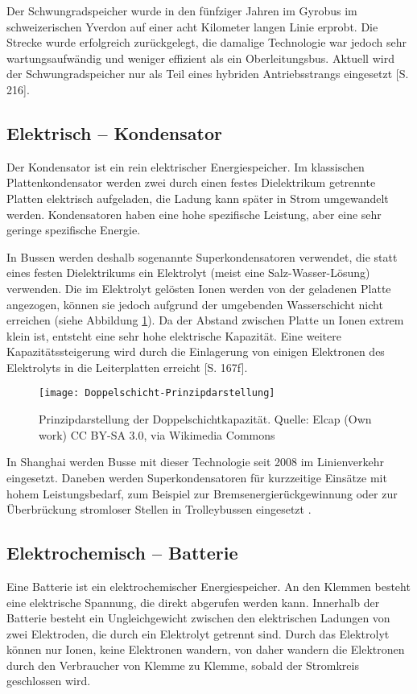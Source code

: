 Der Schwungradspeicher wurde in den fünfziger Jahren im Gyrobus im schweizerischen Yverdon auf einer acht Kilometer langen Linie erprobt. Die Strecke wurde erfolgreich zurückgelegt, die damalige Technologie war jedoch sehr wartungsaufwändig und weniger effizient als ein Oberleitungsbus. Aktuell wird der Schwungradspeicher nur als Teil eines hybriden Antriebsstrangs eingesetzt \cite{tub_aleph001746639}[S. 216].

\subsection{Elektrisch – Kondensator}
Der Kondensator ist ein rein elektrischer Energiespeicher. Im klassischen Plattenkondensator werden zwei durch einen festes Dielektrikum getrennte Platten elektrisch aufgeladen, die Ladung kann später in Strom umgewandelt werden. Kondensatoren haben eine hohe spezifische Leistung, aber eine sehr geringe spezifische Energie.

In Bussen werden deshalb sogenannte Superkondensatoren verwendet, die statt eines festen Dielektrikums ein Elektrolyt (meist eine Salz-Wasser-Lösung) verwenden. Die im Elektrolyt gelösten Ionen werden von der geladenen Platte angezogen, können sie jedoch aufgrund der umgebenden Wasserschicht nicht erreichen (siehe Abbildung \ref{abb_doppelschicht}). Da der Abstand zwischen Platte un Ionen extrem klein ist, entsteht eine sehr hohe elektrische Kapazität. Eine weitere Kapazitätssteigerung wird durch die Einlagerung von einigen Elektronen des Elektrolyts in die Leiterplatten erreicht \cite{Sterner:2014}[S. 167f].

\begin{figure}\centering
	\texttt{[image: Doppelschicht-Prinzipdarstellung]}
	\caption{Prinzipdarstellung der Doppelschichtkapazität. Quelle: Elcap (Own work) CC BY-SA 3.0, via Wikimedia Commons}
	\label{abb_doppelschicht}
\end{figure}

In Shanghai werden Busse mit dieser Technologie seit 2008 im Linienverkehr eingesetzt. Daneben werden Superkondensatoren für kurzzeitige Einsätze mit hohem Leistungsbedarf, zum Beispiel zur Bremsenergierückgewinnung oder zur Überbrückung stromloser Stellen in Trolleybussen eingesetzt \cite{Barminer-Busgesellschaft:2012}.

\subsection{Elektrochemisch – Batterie} %
Eine Batterie ist ein elektrochemischer Energiespeicher. An den Klemmen besteht eine elektrische Spannung, die direkt abgerufen werden kann. Innerhalb der Batterie besteht ein Ungleichgewicht zwischen den elektrischen Ladungen von zwei Elektroden, die durch ein Elektrolyt getrennt sind. Durch das Elektrolyt können nur Ionen, keine Elektronen wandern, von daher wandern die Elektronen durch den Verbraucher von Klemme zu Klemme, sobald der Stromkreis geschlossen wird.

